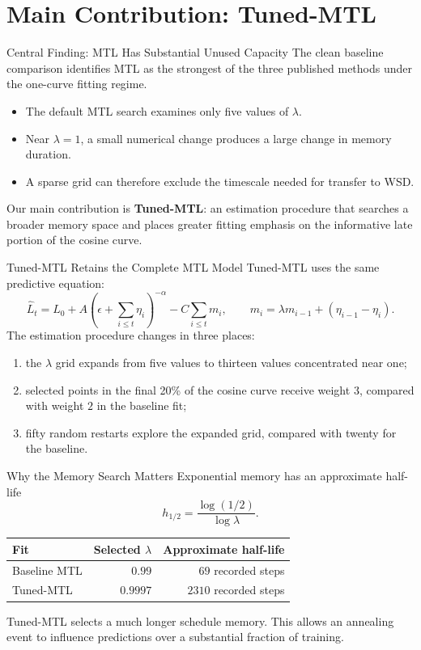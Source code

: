 \documentclass[aspectratio=169]{beamer}
\begin{document}
\section{Main Contribution: Tuned-MTL}

\begin{frame}{Central Finding: MTL Has Substantial Unused Capacity}
  The clean baseline comparison identifies MTL as the strongest of the three published methods under the one-curve fitting regime.
  \begin{itemize}
    \item The default MTL search examines only five values of \(\lambda\).
    \item Near \(\lambda=1\), a small numerical change produces a large change in memory duration.
    \item A sparse grid can therefore exclude the timescale needed for transfer to WSD.
  \end{itemize}
  \vspace{0.4em}
  Our main contribution is \textbf{Tuned-MTL}: an estimation procedure that searches a broader memory space and places greater fitting emphasis on the informative late portion of the cosine curve.
\end{frame}

\begin{frame}{Tuned-MTL Retains the Complete MTL Model}
  Tuned-MTL uses the same predictive equation:
  \[
    \widehat L_t
    =
    L_0+A\left(\epsilon+\sum_{i\leq t}\eta_i\right)^{-\alpha}
    -C\sum_{i\leq t}m_i,
    \qquad
    m_i=\lambda m_{i-1}+(\eta_{i-1}-\eta_i).
  \]
  The estimation procedure changes in three places:
  \begin{enumerate}
    \item the \(\lambda\) grid expands from five values to thirteen values concentrated near one;
    \item selected points in the final 20\% of the cosine curve receive weight \(3\), compared with weight \(2\) in the baseline fit;
    \item fifty random restarts explore the expanded grid, compared with twenty for the baseline.
  \end{enumerate}
\end{frame}

\begin{frame}{Why the Memory Search Matters}
  Exponential memory has an approximate half-life
  \[
    h_{1/2}=\frac{\log(1/2)}{\log\lambda}.
  \]
  \begin{center}
  \begin{tabular}{lrr}
    \toprule
    Fit & Selected \(\lambda\) & Approximate half-life \\
    \midrule
    Baseline MTL & \(0.99\) & \(69\) recorded steps \\
    Tuned-MTL & \(0.9997\) & \(2310\) recorded steps \\
    \bottomrule
  \end{tabular}
  \end{center}
  Tuned-MTL selects a much longer schedule memory. This allows an annealing event to influence predictions over a substantial fraction of training.
\end{frame}
\end{document}

